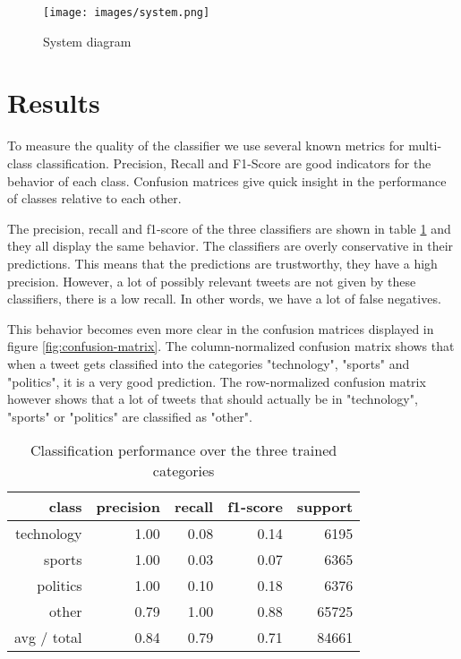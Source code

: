 \documentclass{llncs}
\begin{document}
\begin{figure}[H]
  \centering
  \texttt{[image: images/system.png]}
  \caption{System diagram}
  \label{fig:System diagram}
\end{figure}

\section{Results}
To measure the quality of the classifier we use several known metrics for multi-class classification. Precision, Recall and F1-Score are good indicators for the behavior of each class. Confusion matrices give quick insight in the performance of classes relative to each other.

The precision, recall and f1-score of the three classifiers are shown in table \ref{tbl:classification-report} and they all display the same behavior. The classifiers are overly conservative in their predictions. This means that the predictions are trustworthy, they have a high precision. However, a lot of possibly relevant tweets are not given by these classifiers, there is a low recall. In other words, we have a lot of false negatives. 

This behavior becomes even more clear in the confusion matrices displayed in figure \ref{fig:confusion-matrix}. The column-normalized confusion matrix shows that when a tweet gets classified into the categories "technology", "sports" and "politics", it is a very good prediction. The row-normalized confusion matrix however shows that a lot of tweets that should actually be in "technology", "sports" or "politics" are classified as "other".

\begin{table}
\begin{center}
\begin{tabular}{|r|r|r|r|r|} \hline
class  & precision   & recall & f1-score  & support \\ \hline
 technology    &   1.00 &     0.08  &    0.14   &   6195 \\
     sports   &    1.00   &   0.03   &   0.07   &   6365 \\
   politics   &    1.00  &    0.10   &   0.18   &   6376 \\
      other   &    0.79 &     1.00  &    0.88   &  65725 \\ \hline
avg / total  &     0.84   &   0.79  &    0.71   &  84661 \\ \hline
\end{tabular}
\end{center}
\caption{Classification performance over the three trained categories}
\label{tbl:classification-report}
\end{table}
 
\end{document}
